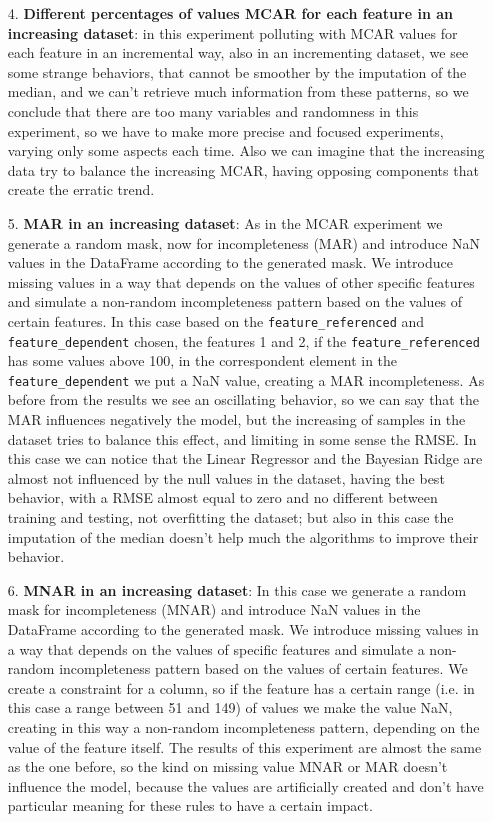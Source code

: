 \documentclass{Configuration_Files/PoliMi3i_thesis}
\begin{document}
\begin{enumerate}
\item[4.] \textbf{Different percentages of values MCAR for each feature in an increasing dataset}: in this experiment polluting with MCAR values for each feature in an incremental way, also in an incrementing dataset, we see some strange behaviors, that cannot be smoother by the imputation of the median, and we can't retrieve much information from these patterns, so we conclude that there are too many variables and randomness in this experiment, so we have to make more precise and focused experiments, varying only some aspects each time. Also we can imagine that the increasing data try to balance the increasing MCAR, having opposing components that create the erratic trend.
\item[5.] \textbf{MAR in an increasing dataset}: As in the MCAR experiment we generate a random mask, now for incompleteness (MAR) and introduce NaN values in the DataFrame according to the generated mask. We introduce missing values in a way that depends on the values of other specific features and simulate a non-random incompleteness pattern based on the values of certain features. In this case based on the \verb|feature_referenced| and \verb|feature_dependent| chosen, the features 1 and 2, if the \verb|feature_referenced| has some values above 100, in the correspondent element in the \verb|feature_dependent| we put a NaN value, creating a MAR incompleteness. As before from the results we see an oscillating behavior, so we can say that the MAR influences negatively the model, but the increasing of samples in the dataset tries to balance this effect, and limiting in some sense the RMSE. In this case we can notice that the Linear Regressor and the Bayesian Ridge are almost not influenced by the null values in the dataset, having the best behavior, with a RMSE almost equal to zero and no different between training and testing, not overfitting the dataset; but also in this case the imputation of the median doesn't help much the algorithms to improve their behavior.
\item[6.] \textbf{MNAR in an increasing dataset}: In this case we generate a random mask for incompleteness (MNAR) and introduce NaN values in the DataFrame according to the generated mask. We introduce missing values in a way that depends on the values of specific features and simulate a non-random incompleteness pattern based on the values of certain features. We create a constraint for a column, so if the feature has a certain range (i.e. in this case a range between 51 and 149) of values we make the value NaN, creating in this way a non-random incompleteness pattern, depending on the value of the feature itself. The results of this experiment are almost the same as the one before, so the kind on missing value MNAR or MAR doesn't influence the model, because the values are artificially created and don't have particular meaning for these rules to have a certain impact.

\end{enumerate}
\end{document}
